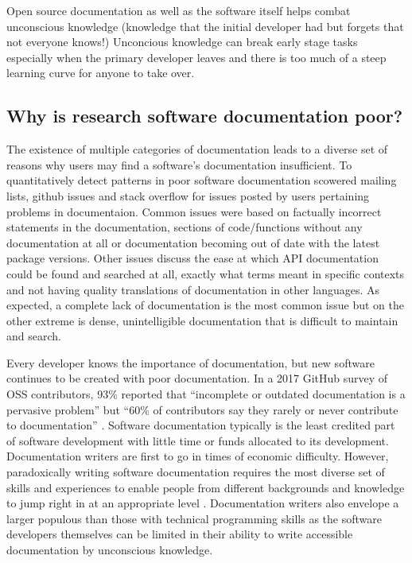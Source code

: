 \documentclass{SBCbookchapter}
\begin{document}

Open source documentation as well as the software itself helps combat unconscious knowledge (knowledge that the initial developer had but forgets that not everyone knows!) Unconcious knowledge can break early stage tasks especially when the primary developer leaves and there is too much of a steep learning curve for anyone to take over.  


\subsection{Why is research software documentation poor?}

The existence of multiple categories of documentation leads to a diverse set of reasons why users may find a software’s documentation insufficient.
To quantitatively detect patterns in poor software documentation \cite{Aghajani2019} scowered mailing lists, github issues and stack overflow for issues posted by users pertaining problems in documentaion. 
Common issues were based on factually incorrect statements in the documentation, sections of code/functions without any documentation at all or documentation becoming out of date with the latest package versions.
Other issues discuss the ease at which API documentation could be found and searched at all, exactly what terms meant in specific contexts and not having quality translations of documentation in other languages.
As expected, a complete lack of documentation is the most common issue but on the other extreme is dense, unintelligible documentation that is difficult to maintain and search.

Every developer knows the importance of documentation, but new software continues to be created with poor documentation.
In a 2017 GitHub survey of OSS contributors, 93\% reported that “incomplete or outdated documentation is a pervasive problem” but “60\% of contributors say they rarely or never contribute to documentation” \cite{Geiger2017}.
Software documentation typically is the least credited part of software development with little time or funds allocated to its development.
Documentation writers are first to go in times of economic difficulty. \cite{Forward2002}
However, paradoxically writing software documentation requires the most diverse set of skills and experiences to enable people from different backgrounds and knowledge to jump right in at an appropriate level \cite{Geiger2018}.
Documentation writers also envelope a larger populous than those with technical programming skills as the software developers themselves can be limited in their ability to write accessible documentation by unconscious knowledge.
\end{document}
